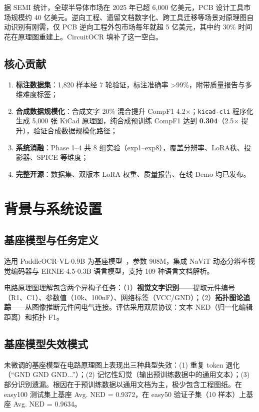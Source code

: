 据 SEMI 统计，全球半导体市场在 2025 年已超 6,000 亿美元，PCB 设计工具市场规模约 40 亿美元。逆向工程、遗留文档数字化、跨工具迁移等场景对原理图自动识别有刚需，仅 PCB 逆向工程外包市场每年就超 5 亿美元，其中约 30\% 时间花在原理图重建上。CircuitOCR 填补了这一空白。

\subsection{核心贡献}

\begin{enumerate}[nosep]
    \item \textbf{标注数据集}：1,820 样本经 7 轮验证，标注准确率 >99\%，附带质量报告与多维难度标签；
    \item \textbf{合成数据规模化}：合成文字 20\% 混合提升 CompF1 4.2$\times$；\texttt{kicad-cli} 程序化生成 5,000 张 KiCad 原理图，纯合成预训练 CompF1 达到 \textbf{0.304}（2.5$\times$ 提升），验证合成数据规模化路径；
    \item \textbf{系统消融}：Phase 1--4 共 8 组实验（exp1--exp8），覆盖分辨率、LoRA秩、投影器、SPICE 等维度；
    \item \textbf{完整开源}：数据集、双版本 LoRA 权重、质量报告、在线 Demo 均已发布。
\end{enumerate}


\section{背景与系统设置}

\subsection{基座模型与任务定义}

选用 PaddleOCR-VL-0.9B 为基座模型~\citep{cui2025paddleocrvl}，参数 908M，集成 NaViT 动态分辨率视觉编码器与 ERNIE-4.5-0.3B 语言模型，支持 109 种语言文档解析。

电路原理图理解包含两个异构子任务：（1）\textbf{视觉文字识别}——提取元件编号（R1、C1）、参数值（10k、100nF）、网络标签（VCC/GND）；（2）\textbf{拓扑图论追踪}——从图像推断元件间电气连接。评估采用双层协议：文本 NED（归一化编辑距离）和拓扑 F1。

\subsection{基座模型失效模式}

未微调的基座模型在电路原理图上表现出三种典型失效：(1) 重复 token 退化（``GND GND GND...''）；(2) 记忆性幻觉（输出预训练数据中的通用文本）；(3) 部分识别遗漏。根因在于预训练数据以通用文档为主，极少包含工程图纸。在 easy100 测试集上基座 Avg. NED = 0.9372，在 easy50 验证子集（10 样本）上基座 Avg. NED = 0.9634。

